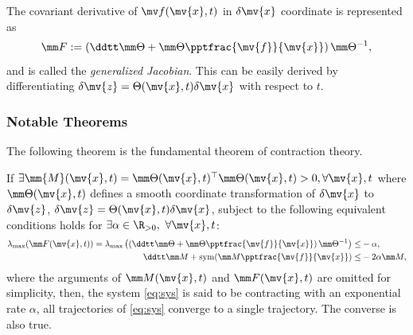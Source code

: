 \documentclass{article}
\newcommand*{\bdx}{\mv{x}} %
\newcommand*{\bdz}{\mv{z}} %
\newcommand*{\bdf}{\mv{f}} %
\newcommand*{\tpfpx}{\pptfrac{\bdf}{\bdx}} %
\DeclareMathOperator{\sym}{sym}
\begin{document}
\begin{definition}
    The covariant derivative of $\mv f(\bdx,t)$ in $\delta\bdx$ coordinate is represented as 
    \begin{equation}
        \mm F
        :=
        \left(
            \ddtt\mm\Theta
            +
            \mm\Theta\tpfpx
        \right)
        \mm\Theta^{-1}
        ,
    \end{equation}
    and is called the \textit{generalized Jacobian}.
    This can be easily derived by differentiating $\delta\bdz = \Theta(\bdx,t)\delta\bdx$ with respect to $t$.
\end{definition}

\subsubsection{Notable Theorems}

The following theorem is the fundamental theorem of contraction theory.
\begin{theorem}
    If $
        \exists \mm{M}(\bdx,t)
        =
        \mm\Theta(\bdx,t)^\top
        \mm\Theta(\bdx,t)
        > 0, \forall \bdx,t
    $ where $\mm\Theta(\bdx,t)$ defines a smooth coordinate transformation of $\delta\bdx$ to $\delta\bdz$, \ie $\delta\bdz = \Theta(\bdx,t)\delta\bdx$, subject to the following equivalent conditions holds for $\exists\alpha\in\R_{>0},\ \forall \bdx,t$:
    \begin{subequations}
        \begin{align}
            \lambda_{\max} (
                \mm F(\bdx,t)
            )
            =
            \lambda_{\max} 
            \left(
                \left(    
                \ddtt \mm\Theta
                +
                \mm\Theta\tpfpx
                \right)
                \mm\Theta^{-1}
            \right)
            \le&
            -\alpha
            ,
            \\
            \ddtt \mm M
            +
            \sym(\mm M\tpfpx)
            \le&
            -2\alpha\mm M
            ,
        \end{align}
    \end{subequations}
    where the arguments of $\mm M(\bdx,t)$ and $\mm F(\bdx,t)$ are omitted for simplicity, then, the system \eqref{eq:sys} is said to be contracting with an exponential rate $\alpha$, \ie all trajectories of \eqref{eq:sys} converge to a single trajectory.
    The converse is also true.
    \label{thm:ctrac:main}
\end{theorem}
\end{document}
